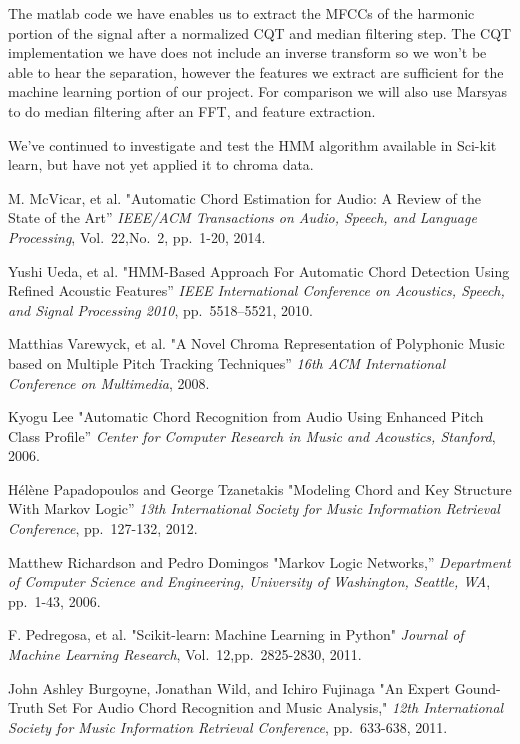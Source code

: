 \documentclass{article}
\begin{document}
The matlab code we have enables us to extract the MFCCs of the harmonic portion of the signal
after a normalized CQT and median filtering step. The CQT implementation we have does not include an inverse
transform so we won't be able to hear the separation, however the features we extract are sufficient for the machine learning 
portion of our project. For comparison we will also use Marsyas to do median filtering after an FFT, and feature extraction.

We've continued to investigate and test the HMM algorithm available in Sci-kit learn, but have not
yet applied it to chroma data.

\begin{thebibliography}{citations}

M. McVicar, et al.
"Automatic Chord Estimation for Audio: A Review of the State of the Art''
{\it IEEE/ACM Transactions on Audio, Speech, and Language Processing},
Vol.~22,No.~2, pp.~1-20, 2014.

Yushi Ueda, et al.
"HMM-Based Approach For Automatic Chord Detection Using Refined Acoustic
Features''
{\it IEEE International Conference on Acoustics, Speech, and Signal Processing 2010},
pp.~5518--5521, 2010.

Matthias Varewyck, et al.
"A Novel Chroma Representation of Polyphonic Music based on Multiple Pitch
Tracking Techniques''
{\it 16th ACM International Conference on Multimedia},
2008.

Kyogu Lee
"Automatic Chord Recognition from Audio Using Enhanced Pitch Class Profile''
{\it Center for Computer Research in Music and Acoustics, Stanford},
2006.

Hélène Papadopoulos and George Tzanetakis
"Modeling Chord and Key Structure With Markov Logic''
{\it 13th International Society for Music Information Retrieval Conference},
pp.~127-132, 2012.

Matthew Richardson and Pedro Domingos
"Markov Logic Networks,''
{\it Department of Computer Science and Engineering, University of Washington, Seattle, WA},
pp.~1-43, 2006.

F. Pedregosa, et al.
"Scikit-learn: Machine Learning in Python"
{\it Journal of Machine Learning Research},
Vol.~12,pp.~2825-2830, 2011.

John Ashley Burgoyne, Jonathan Wild, and Ichiro Fujinaga
"An Expert Gound-Truth Set For Audio Chord Recognition and Music Analysis,"
{\it 12th International Society for Music Information Retrieval Conference},
pp.~633-638, 2011.


\end{thebibliography}
\end{document}

